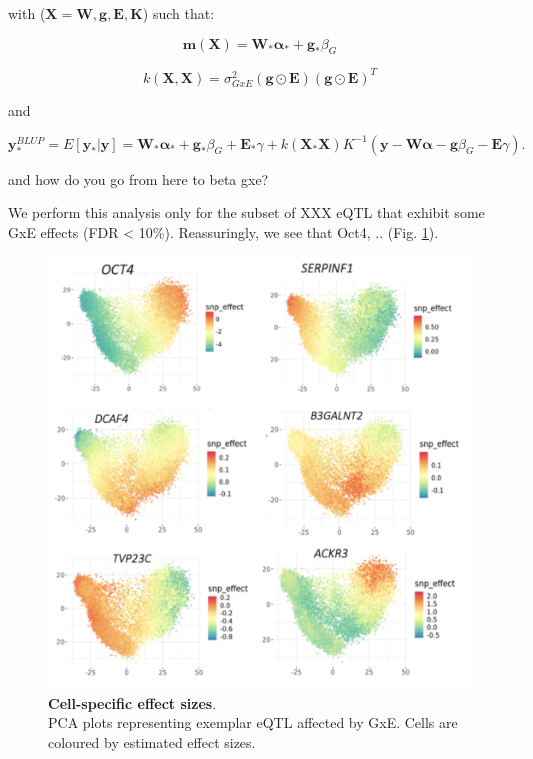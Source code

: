 with ($\mathbf{X} = {\mathbf{W},\mathbf{g},\mathbf{E},\mathbf{K}}$) such that:

\begin{equation}
    \mathbf{m}(\mathbf{X}) = \mathbf{W}_*\boldsymbol{\alpha}_{*}+\mathbf{g}_*\beta_G
\end{equation}

\begin{equation}
    k(\mathbf{X},\mathbf{X}) = \sigma_{GxE}^2(\mathbf{g}\odot\mathbf{E})(\mathbf{g}\odot\mathbf{E})^T
\end{equation}

and 

\begin{equation}
\mathbf{y}_{*}^{BLUP} = E[\mathbf{y}_*|\mathbf{y}] = \mathbf{W}_*\boldsymbol{\alpha}_{*}+\mathbf{g}_*\beta_G+\mathbf{E}_*\gamma + k(\mathbf{X}_*\mathbf{X})K^{-1}(\mathbf{y}-\mathbf{W}\boldsymbol{\alpha}-\mathbf{g}\beta_G-\mathbf{E}\gamma).
\end{equation}

and how do you go from here to beta gxe?

\newpage



We perform this analysis only for the subset of XXX eQTL that exhibit some GxE effects (FDR < 10\%).
Reassuringly, we see that Oct4, .. (Fig. \ref{fig:sc_structlmm_pcas}).\\

\begin{figure}[htbp]
\centering
\includegraphics[width=15.5cm]{Chapter6/Fig/sc_structlmm_pcas.png}
\caption[Cell-specific effect sizes]{\textbf{Cell-specific effect sizes}.\\
PCA plots representing exemplar eQTL affected by GxE.
Cells are coloured by estimated effect sizes.}
\label{fig:sc_structlmm_pcas}
\end{figure}

